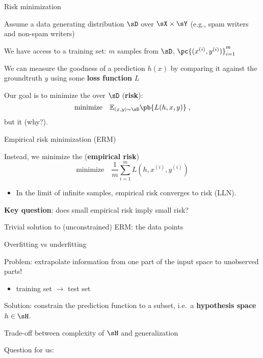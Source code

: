 \documentclass[usenames,dvipsnames,notes,11pt,aspectratio=169]{beamer}
\begin{document}
\begin{frame}
    {Risk minimization}

    \begin{wideitemize}[<+->]
        \item Assume a data generating distribution $\sD$ over $\sX\times\sY$ (e.g., spam writers and non-spam writers)
        \item We have access to a training set: $m$ samples from $\sD$, $\pc{(x^{(i)}, y^{(i)})}_{i=1}^m$
        \item We can measure the goodness of a prediction $h(x)$ by comparing it against the groundtruth $y$ using some \textbf{loss function} $L$
        \item Our goal is to minimize the  over $\sD$ (\textbf{risk}):
            $$
\text{minimize}\quad \mathbb{E}_{(x,y)\sim\sD}\pb{L(h,x,y)} \;,
            $$
            but it  (why?).
    \end{wideitemize}
\end{frame}

\begin{frame}
    {Empirical risk minimization (ERM)}

    \begin{wideitemize}[<+->]
        \item Instead, we minimize the  (\textbf{empirical risk})  %
    $$
    \text{minimize}\quad \frac{1}{m}\sum_{i=1}^m L(h, x^{(i)}, y^{(i)})
    $$
            \begin{itemize}
                \item {In the limit of infinite samples, empirical risk converges to risk (LLN).}
            \end{itemize}
        \item {\bf Key question}: does small empirical risk imply small risk? 
        \item Trivial solution to (unconstrained) ERM:  the data points
    \end{wideitemize}
\end{frame}

\begin{frame}
    {Overfitting vs underfitting}
    \begin{wideitemize}
        \item Problem: extrapolate information from one part of the input space to unobserved parts!
            \begin{itemize}
                \item training set $\to$ test set
            \end{itemize}
        \item Solution: constrain the prediction function to a subset, i.e.\ a \textbf{hypothesis space} $h\in \sH$.
            \pause
        \item Trade-off between complexity of $\sH$ and generalization 
        \item Question for us: 
    \end{wideitemize}
\end{frame}
\end{document}

